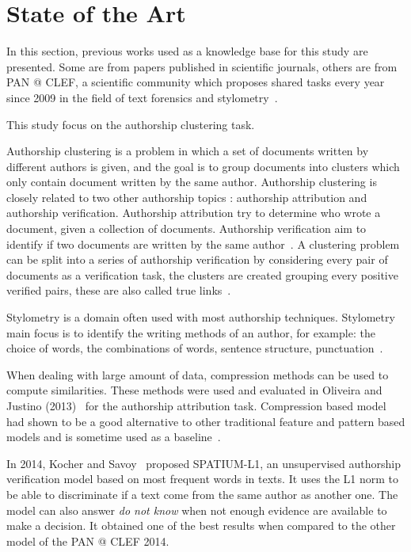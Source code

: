 \chapter{State of the Art \label{sec:state_of_the_art}}

In this section, previous works used as a knowledge base for this study are presented.
Some are from papers published in scientific journals, others are from PAN @ CLEF, a scientific community which proposes shared tasks every year since 2009 in the field of text forensics and stylometry~\cite{pan_webis}.

This study focus on the authorship clustering task.

Authorship clustering is a problem in which a set of documents written by different authors is given, and the goal is to group documents into clusters which only contain document written by the same author.
Authorship clustering is closely related to two other authorship topics : authorship attribution and authorship verification.
Authorship attribution try to determine who wrote a document, given a collection of documents.
Authorship verification aim to identify if two documents are written by the same author~\cite{pan11_verif}.
A clustering problem can be split into a series of authorship verification by considering every pair of documents as a verification task, the clusters are created grouping every positive verified pairs, these are also called true links~\cite{pan16_clustering_site}.

Stylometry is a domain often used with most authorship techniques.
Stylometry main focus is to identify the writing methods of an author, for example: the choice of words, the combinations of words, sentence structure, punctuation~\cite{savoy_stylo}.

When dealing with large amount of data, compression methods can be used to compute similarities.
These methods were used and evaluated in Oliveira and Justino (2013)~\cite{comparing_compression} for the authorship attribution task.
Compression based model had shown to be a good alternative to other traditional feature and pattern based models and is sometime used as a baseline~\cite{overview_pan20}.

In 2014, Kocher and Savoy~\cite{kocher_linking} proposed SPATIUM-L1, an unsupervised authorship verification model based on most frequent words in texts.
It uses the L1 norm to be able to discriminate if a text come from the same author as another one.
The model can also answer \textit{do not know} when not enough evidence are available to make a decision.
It obtained one of the best results when compared to the other model of the PAN @ CLEF 2014.

